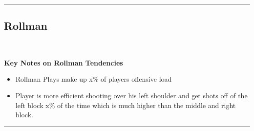 \documentclass[a4paper,12pt]{article}
\begin{document}
\vspace{-1em} %
\hrule height 1pt width 1\textwidth %
\vspace{1em} %

\clearpage




\subsection{Rollman}\

\vspace{0.25em} %
\textbf{Key Notes on Rollman Tendencies}
\vspace{0.5em} %

\begin{itemize}
    \item Rollman Plays make up x\% of players offensive load
    \vspace{0.3em} %
    \item Player is more efficient shooting over his left shoulder and get shots off of the left block x\% of the time which is much higher than the middle and right block.
\end{itemize}

\vspace{1em} %
\hrule height 1pt width 1\textwidth %
\vspace{0em} %
\end{document}
